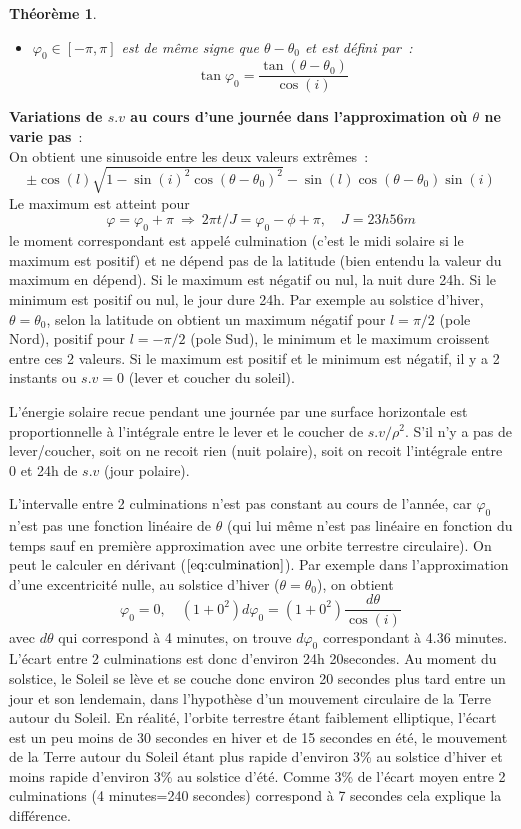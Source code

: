 \documentclass[a4paper,11pt]{article}
\newtheorem{thm}{Théorème}
\begin{document}
\begin{giacjshere}
\begin{thm}
\begin{itemize}
de la rotation de la Terre (somme de la longitude g\'eographique $\phi$ et 
du terme d\'ependant du temps $2\pi t/J$)
\item  $\varphi_0 \in [-\pi,\pi]$ est de m\^eme signe que $\theta-\theta_0$
et est d\'efini par~:
\begin{equation} \label{eq:culmination}
\tan \varphi_0 = \frac{\tan(\theta-\theta_0)}{\cos(i)} 
\end{equation}
\end{itemize}
\end{thm}
{\bf Variations de $s.v$ au cours d'une journ\'ee dans l'approximation o\`u
$\theta$ ne varie pas}~:\\
On obtient une sinusoide entre les deux valeurs extr\^emes~:
\[ \pm \cos(l) \sqrt{1 - \sin(i)^2 \cos(\theta-\theta_0)^2 } -
 \sin(l) \cos(\theta-\theta_0)\sin(i) \]
Le maximum est atteint pour 
\[ \varphi=\varphi_0+ \pi \ \Rightarrow \ 
2 \pi t/J = \varphi_0 - \phi + \pi, \quad J=23h56m \]
le moment correspondant est appel\'e culmination (c'est le midi
solaire si le maximum est positif) et ne d\'epend pas de la latitude
(bien entendu la valeur du maximum en d\'epend).
Si le maximum est n\'egatif ou nul, la nuit dure 24h.
Si le minimum est positif ou nul, le jour dure 24h.
Par exemple au solstice d'hiver, $\theta=\theta_0$, selon la latitude
on obtient un maximum n\'egatif pour $l=\pi/2$ (pole Nord), positif 
pour $l=-\pi/2$ (pole Sud), le minimum et le maximum croissent 
entre ces 2 valeurs.
Si le maximum est positif et le minimum est n\'egatif, il y a
2 instants ou $s.v=0$ (lever et coucher du soleil).

L'\'energie solaire recue pendant une journ\'ee par une surface
horizontale est proportionnelle \`a l'int\'egrale entre le lever
et le coucher de $s.v/\rho^2$. S'il n'y a pas de lever/coucher, 
soit on ne recoit rien (nuit polaire),
soit on recoit l'int\'egrale entre 0 et 24h de $s.v$ (jour polaire).

L'intervalle entre 2 culminations n'est pas constant au cours de
l'ann\'ee, car $\varphi_0$ n'est pas une fonction lin\'eaire de
$\theta$ (qui lui m\^eme n'est pas lin\'eaire en fonction du temps
sauf en premi\`ere approximation avec une orbite terrestre
circulaire). On peut le calculer en d\'erivant (\(\ref{eq:culmination}\)).
Par exemple dans l'approximation d'une excentricit\'e nulle,
au solstice d'hiver ($\theta=\theta_0$), on obtient
\[ \varphi_0= 0, \quad (1+0^2) d\varphi_0 = (1+0^2)\frac{d\theta} {\cos(i)} \]
avec $d\theta$ qui correspond \`a 4 minutes, on trouve $d\varphi_0$
correspondant \`a 4.36 minutes.
L'\'ecart entre 2 culminations
est donc d'environ 24h 20secondes. 
Au moment du solstice, le Soleil se l\`eve et se couche donc environ
20 secondes plus tard entre un jour et son lendemain, dans 
l'hypothèse d'un mouvement circulaire de la Terre autour du Soleil. 
En réalité, l'orbite terrestre étant faiblement elliptique,
l'écart est un peu moins de 30 secondes en hiver et de 15 secondes en été, 
le mouvement de la Terre autour du Soleil étant plus rapide d'environ
3\% au solstice d'hiver et moins rapide d'environ 3\% au
solstice d'été. Comme 3\%
de l'écart moyen entre 2 culminations (4 minutes=240 secondes) 
correspond à 7 secondes cela explique la différence.


\end{giacjshere}
\end{document}
